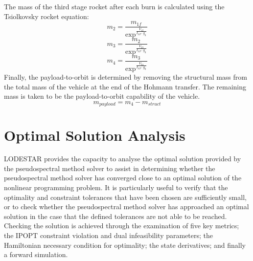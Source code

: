 The mass of the third stage rocket after each burn is calculated using the Tsiolkovsky rocket equation:
\begin{equation}
m_2 = \frac{m_{1f}}{\exp^{\frac{V_{12}}{I_{SP} \cdot g_0}}}
\end{equation}
\begin{equation}
m_3 = \frac{m_{2}}{\exp^{\frac{V_{23}}{I_{SP} \cdot g_0}}}
\end{equation}
\begin{equation}
m_4 = \frac{m_{3}}{\exp^{\frac{V_{34}}{I_{SP} \cdot g_0}}}
\end{equation}
Finally, the payload-to-orbit is determined by removing the structural mass from the total mass of the vehicle at the end of the Hohmann transfer. The remaining mass is taken to be the payload-to-orbit capability of the vehicle.
\begin{equation}
m_{payload} = m_4 - m_{struct}
\end{equation}







\section{Optimal Solution Analysis}\label{sec:verification}

LODESTAR provides the capacity to analyse the optimal solution provided by the pseudospectral method solver to assist in determining whether the pseudospectral method solver has converged close to an optimal solution of the nonlinear programming problem. It is particularly useful to verify that the optimality and constraint tolerances that have been chosen are sufficiently small, or to check whether the pseudospectral method solver has approached an optimal solution in the case that the defined tolerances are not able to be reached.   
Checking the solution is achieved through the examination of five key metrics; the IPOPT constraint violation and dual infeasibility parameters; the Hamiltonian necessary condition for optimality; the state derivatives; and finally a forward simulation. 

